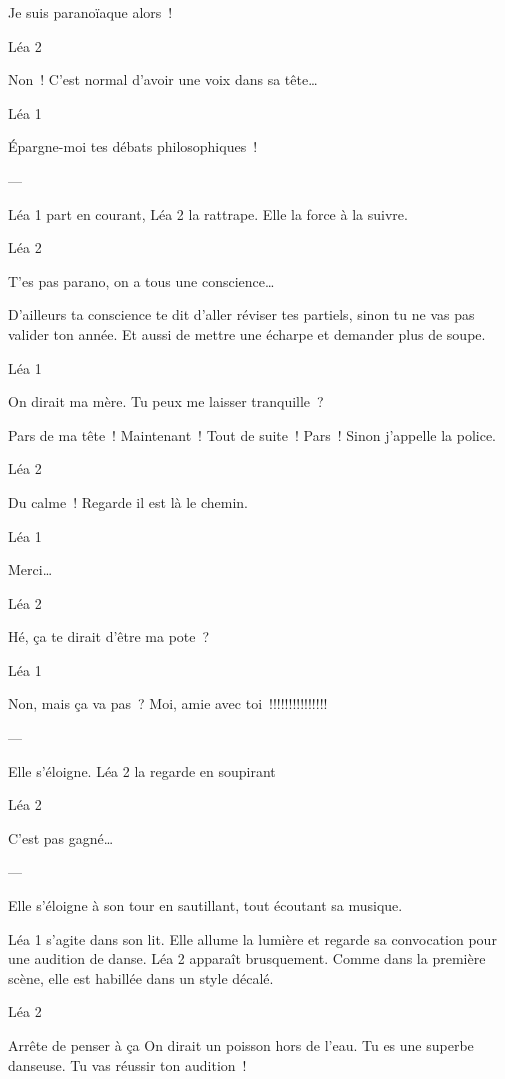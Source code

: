 \documentclass{frscenario}
\begin{document}
Je suis paranoïaque alors !

\— Léa 2

Non ! C’est normal d’avoir une voix dans sa tête…

\— Léa 1

Épargne-moi tes débats philosophiques !

\——

Léa 1 part en courant, Léa 2 la rattrape. Elle la force à la suivre.

\— Léa 2

T’es pas parano, on a tous une conscience…

D’ailleurs ta conscience te dit d’aller réviser tes partiels, sinon tu ne vas pas valider ton année. Et aussi de mettre une écharpe et demander plus de soupe.

\— Léa 1

On dirait ma mère. Tu peux me laisser tranquille ?

Pars de ma tête ! Maintenant ! Tout de suite ! Pars ! Sinon j’appelle la police.

\— Léa 2

Du calme ! Regarde il est là le chemin.

\— Léa 1

Merci…

\— Léa 2

Hé, ça te dirait d’être ma pote ?

\— Léa 1

Non, mais ça va pas ? Moi, amie avec toi !!!!!!!!!!!!!!!

\——

Elle s’éloigne. Léa 2 la regarde en soupirant

\— Léa 2

C’est pas gagné…

\——

Elle s’éloigne à son tour en sautillant, tout écoutant sa musique.


Léa 1 s’agite dans son lit. Elle allume la lumière et regarde sa convocation pour une audition de danse. Léa 2 apparaît brusquement. Comme dans la première scène, elle est habillée dans un style décalé.

\— Léa 2

Arrête de penser à ça
On dirait un poisson hors de l’eau. Tu es une superbe danseuse. Tu vas réussir ton audition !
\end{document}
